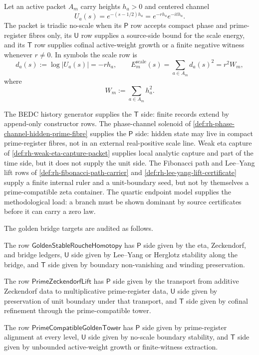 \begin{definition}
\label{def:rh-triadic-no-scale-packet}
Let an active packet $A_m$ carry heights $h_a>0$ and centered channel
$$
U_a(s)=e^{-(s-1/2)h_a}=e^{-rh_a}e^{-it h_a}.
$$
The packet is triadic no-scale when its $\mathsf P$ row accepts compact
phase and prime-register fibres only, its $\mathsf U$ row supplies a
source-side bound for the scale energy, and its $\mathsf T$ row supplies
cofinal active-weight growth or a finite negative witness whenever
$r\ne0$.  In symbols the scale row is
$$
d_a(s):=\log|U_a(s)|=-r h_a,
\qquad
E_m^{\mathrm{scale}}(s)=\sum_{a\in A_m}d_a(s)^2=r^2W_m,
$$
where
$$
W_m:=\sum_{a\in A_m}h_a^2.
$$
\end{definition}

\begin{principle}
\label{prin:rh-stable-rows-fit-triadic-audit}
The BEDC history generator supplies the $\mathsf T$ side: finite
records extend by append-only constructor rows.  The phase-channel
solenoid of \autoref{def:rh-phase-channel-hidden-prime-fibre} supplies
the $\mathsf P$ side: hidden state may live in compact prime-register
fibres, not in an external real-positive scale line.  Weak eta capture
of \autoref{def:rh-weak-eta-capture-packet} supplies local analytic
capture and part of the time side, but it does not supply the unit side.
The Fibonacci path and Lee--Yang lift rows of
\autoref{def:rh-fibonacci-path-carrier} and
\autoref{def:rh-lee-yang-lift-certificate} supply a finite internal
ruler and a unit-boundary seed, but not by themselves a prime-compatible
zeta container.  The quartic endpoint model supplies the methodological
load: a branch must be shown dominant by source certificates before it
can carry a zero law.
\end{principle}

\begin{definition}
\label{def:rh-audited-golden-bridge-rows}
The golden bridge targets are audited as follows.

The row $\mathsf{GoldenStableRoucheHomotopy}$ has $\mathsf P$ side
given by the eta, Zeckendorf, and bridge ledgers, $\mathsf U$ side given
by Lee--Yang or Herglotz stability along the bridge, and $\mathsf T$
side given by boundary non-vanishing and winding preservation.

The row $\mathsf{PrimeZeckendorfLift}$ has $\mathsf P$ side given by
the transport from additive Zeckendorf data to multiplicative
prime-register data, $\mathsf U$ side given by preservation of unit
boundary under that transport, and $\mathsf T$ side given by cofinal
refinement through the prime-compatible tower.

The row $\mathsf{PrimeCompatibleGoldenTower}$ has $\mathsf P$ side
given by prime-register alignment at every level, $\mathsf U$ side
given by no-scale boundary stability, and $\mathsf T$ side given by
unbounded active-weight growth or finite-witness extraction.
\end{definition}

